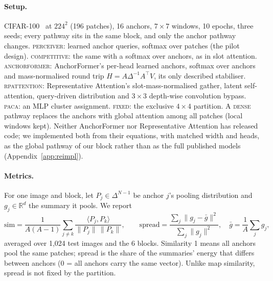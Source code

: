 \documentclass[10pt]{article}
\begin{document}
\paragraph{Setup.} CIFAR-100~\citep{krizhevsky2009cifar} at $224^2$ (196 patches), 16 anchors,
$7\times7$ windows, 10 epochs, three seeds; every pathway sits in the same block, and only the
anchor pathway changes. \textsc{perceiver}: learned anchor queries, softmax over patches (the
pilot design). \textsc{competitive}: the same with a softmax over anchors, as in slot attention.
\textsc{anchorformer}: AnchorFormer's per-head learned anchors, softmax over anchors and
mass-normalised round trip $H=A\Delta^{-1}A^{\top}V$, its only described stabiliser.
\textsc{rpattention}: Representative Attention's slot-mass-normalised gather, latent
self-attention, query-driven distribution and $3\times3$ depth-wise convolution bypass.
\textsc{paca}: an MLP cluster assignment. \textsc{fixed}: the exclusive $4\times4$ partition. A
\textsc{dense} pathway replaces the anchors with global attention among all patches (local windows
kept). Neither AnchorFormer nor Representative Attention has released code; we implemented both
from their equations, with matched width and heads, as the global pathway of our block rather
than as the full published models (Appendix~\ref{app:reimpl}).

\paragraph{Metrics.} For one image and block, let $P_j\in\Delta^{N-1}$ be anchor $j$'s pooling
distribution and $g_j\in\mathbb{R}^{d}$ the summary it pools. We report
\begin{equation}
\mathrm{sim}=\frac{1}{A(A-1)}\sum_{j\neq k}\frac{\langle P_j,P_k\rangle}{\|P_j\|\,\|P_k\|},
\qquad
\mathrm{spread}=\frac{\sum_j\|g_j-\bar g\|^2}{\sum_j\|g_j\|^2},\quad \bar g=\frac{1}{A}\sum_j g_j ,
\label{eq:metrics}
\end{equation}
averaged over 1{,}024 test images and the 6 blocks. Similarity 1 means all anchors pool the same
patches; spread is the share of the summaries' energy that differs between anchors (0 = all
anchors carry the same vector). Unlike map similarity, spread is not fixed by the partition.
\end{document}
